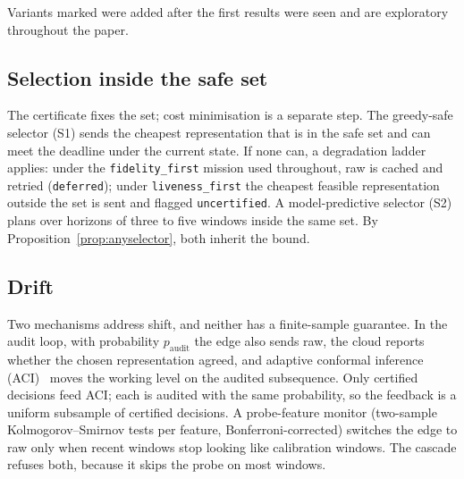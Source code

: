 Variants marked \expl{} were added after the first results were seen and are exploratory
throughout the paper.

\subsection{Selection inside the safe set}

The certificate fixes the set; cost minimisation is a separate step. The greedy-safe selector (S1)
sends the cheapest representation that is in the safe set and can meet the deadline under the
current state. If none can, a degradation ladder applies: under the \texttt{fidelity\_first}
mission used throughout, raw is cached and retried (\texttt{deferred}); under
\texttt{liveness\_first} the cheapest feasible representation outside the set is sent and flagged
\texttt{uncertified}. A model-predictive selector (S2) plans over horizons of three to five windows
inside the same set. By Proposition~\ref{prop:anyselector}, both inherit the bound.

\subsection{Drift}

Two mechanisms address shift, and neither has a finite-sample guarantee. In the audit loop, with
probability $p_{\mathrm{audit}}$ the edge also sends raw, the cloud reports whether the chosen
representation agreed, and adaptive conformal inference (ACI)~\cite{gibbs2021aci} moves the working
level on the audited subsequence. Only certified decisions feed ACI; each is audited with the same
probability, so the feedback is a uniform subsample of certified decisions. A probe-feature monitor (two-sample Kolmogorov--Smirnov
tests per feature, Bonferroni-corrected) switches the edge to raw only when recent windows stop
looking like calibration windows. The cascade refuses both, because it skips the probe on most
windows.
